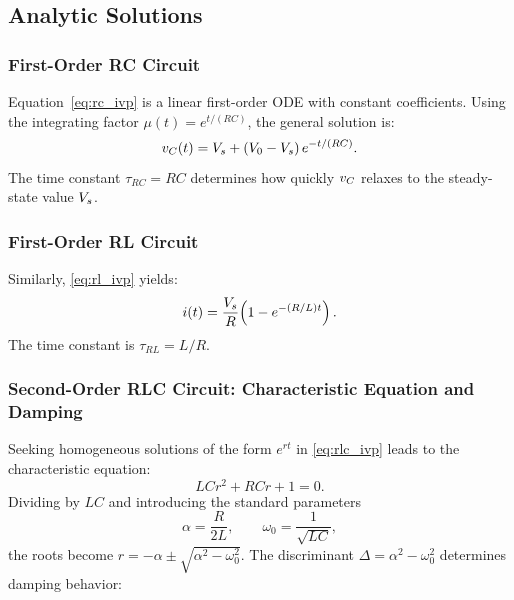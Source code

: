 \subsection{Analytic Solutions}

\subsubsection{First-Order RC Circuit}

Equation~\eqref{eq:rc_ivp} is a linear first-order ODE with constant
coefficients.
Using the integrating factor $\mu(t) = e^{t/(RC)}$, the general solution is:
\begin{equation}
  v_C(t) = V_s + (V_0 - V_s)\,e^{-t/(RC)}.
  \label{eq:rc_sol}
\end{equation}
The time constant $\tau_{RC} = RC$ determines how quickly $v_C$ relaxes to
the steady-state value $V_s$.

\subsubsection{First-Order RL Circuit}

Similarly, \eqref{eq:rl_ivp} yields:
\begin{equation}
  i(t) = \frac{V_s}{R}\!\left(1 - e^{-(R/L)t}\right).
  \label{eq:rl_sol}
\end{equation}
The time constant is $\tau_{RL} = L/R$.

\subsubsection{Second-Order RLC Circuit: Characteristic Equation and Damping}

Seeking homogeneous solutions of the form $e^{rt}$ in \eqref{eq:rlc_ivp}
leads to the characteristic equation:
\begin{equation}
  LCr^2 + RCr + 1 = 0.
  \label{eq:char}
\end{equation}
Dividing by $LC$ and introducing the standard parameters
\begin{equation}
  \alpha = \frac{R}{2L}, \qquad \omega_0 = \frac{1}{\sqrt{LC}},
  \label{eq:params}
\end{equation}
the roots become $r = -\alpha \pm \sqrt{\alpha^2 - \omega_0^2}$.
The discriminant $\Delta = \alpha^2 - \omega_0^2$ determines damping behavior:

